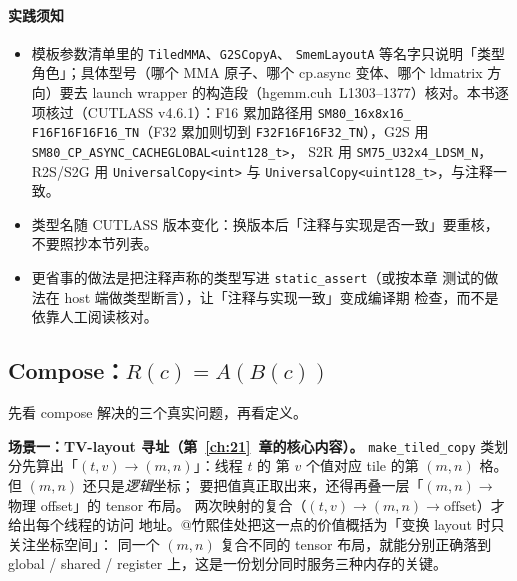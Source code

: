 \paragraph{实践须知}
\begin{itemize}
  \item 模板参数清单里的 \texttt{TiledMMA}、\texttt{G2SCopyA}、
        \texttt{SmemLayoutA} 等名字只说明「类型角色」；具体型号（哪个 MMA
        原子、哪个 cp.async 变体、哪个 ldmatrix 方向）要去 launch wrapper
        的构造段（hgemm.cuh~L1303--1377）核对。本书逐项核过（CUTLASS
        v4.6.1）：F16 累加路径用 \texttt{SM80\_\allowbreak{}16x8x16\_\allowbreak{}}\allowbreak
        \texttt{F16\allowbreak{}F16\allowbreak{}F16\allowbreak{}F16\_\allowbreak{}TN}（F32 累加则切到
        \texttt{F32\allowbreak{}F16\allowbreak{}F16\allowbreak{}F32\_\allowbreak{}TN}），G2S 用
        \texttt{SM80\_\allowbreak{}CP\_\allowbreak{}ASYNC\_\allowbreak{}}\allowbreak\texttt{CACHEGLOBAL\allowbreak{}<uint128\_\allowbreak{}t>}，
        S2R 用 \texttt{SM75\_\allowbreak{}U32x4\_\allowbreak{}LDSM\_\allowbreak{}N}，R2S/S2G 用
        \texttt{Universal\allowbreak{}Copy\allowbreak{}<int>} 与
        \texttt{Universal\allowbreak{}Copy\allowbreak{}<}\allowbreak\texttt{uint128\_t>}，与注释一致。
  \item 类型名随 CUTLASS 版本变化：换版本后「注释与实现是否一致」要重核，
        不要照抄本节列表。
  \item 更省事的做法是把注释声称的类型写进 \texttt{static\_\allowbreak{}assert}（或按本章
        测试的做法在 host 端做类型断言），让「注释与实现一致」变成编译期
        检查，而不是依靠人工阅读核对。
\end{itemize}

\subsection{Compose：$R(c)=A(B(c))$}

先看 compose 解决的三个真实问题，再看定义。

\textbf{场景一：TV-layout 寻址（第~\ref{ch:21}~章的核心内容）。}
\texttt{make\_\allowbreak{}tiled\_\allowbreak{}copy} 类划分先算出「$(t,v)\to(m,n)$」：线程 $t$ 的
第 $v$ 个值对应 tile 的第 $(m,n)$ 格。但 $(m,n)$ 还只是\emph{逻辑}坐标；
要把值真正取出来，还得再叠一层「$(m,n)\to$ 物理 offset」的 tensor 布局。
两次映射的复合（$(t,v)\to(m,n)\to\mathrm{offset}$）才给出每个线程的访问
地址。@竹熙佳处把这一点的价值概括为「变换 layout 时只关注坐标空间」：
同一个 $(m,n)$ 复合不同的 tensor 布局，就能分别正确落到 global / shared /
register 上，这是一份划分同时服务三种内存的关键。

